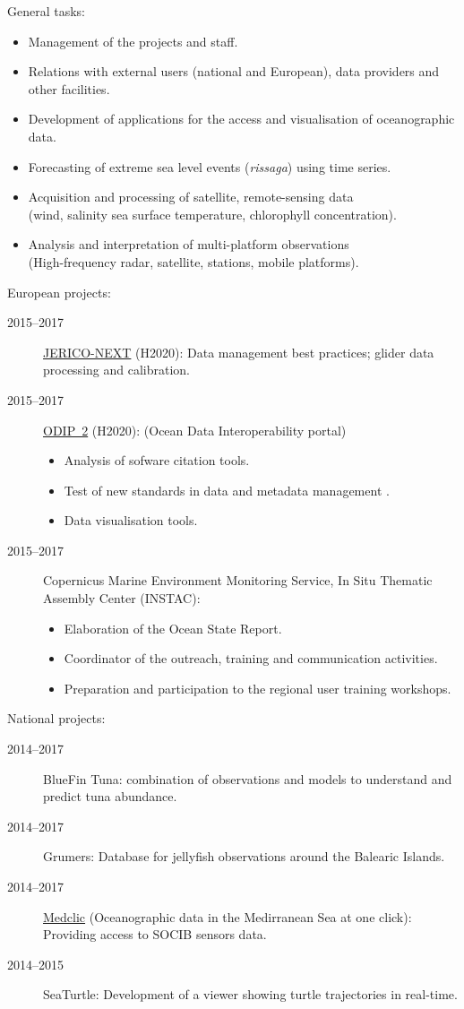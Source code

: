 \documentclass[10pt,a4paper,svgnames]{article}
\begin{document}
\begin{description}
General tasks:
\begin{itemize}%
\item Management of the projects and staff.
\item Relations with external users (national and European), data providers and other facilities.
\item Development of applications for the access and visualisation of oceanographic data.
\item Forecasting of extreme sea level events (\textit{rissaga}) using time series.
\item Acquisition and processing of satellite, remote-sensing data\\(wind, salinity sea surface temperature, chlorophyll concentration).
\item Analysis and interpretation of multi-platform observations\\(High-frequency radar, satellite, stations, mobile platforms).
\end{itemize}
European projects:
\begin{description}
\item[2015--2017] \href{http://www.jerico-ri.eu/}{JERICO-NEXT} (H2020): Data management best practices; glider data processing and calibration.
\item[2015--2017] \href{http://www.odip.eu/}{ODIP~2} (H2020):  (Ocean Data Interoperability portal)
\begin{itemize}
\item Analysis of sofware citation tools.
\item Test of new standards in data and metadata management .
\item Data visualisation tools.
\end{itemize}

\item[2015--2017] Copernicus Marine Environment Monitoring Service, In Situ Thematic Assembly Center (INSTAC):
\begin{itemize}
\item Elaboration of the Ocean State Report.
\item Coordinator of the outreach, training and communication activities.
\item Preparation and participation to the regional user training workshops.
\end{itemize}
\end{description}
National projects:
\begin{description}
\item[2014--2017] BlueFin Tuna: combination of observations and models to understand and predict tuna abundance.
\item[2014--2017] Grumers: Database for jellyfish observations around the Balearic Islands. 
\item[2014--2017] \href{http://medclic.es/es/news/research/asimilacion-datos.html}{Medclic} (Oceanographic data in the Medirranean Sea at one click): Providing access to SOCIB sensors data.
\item[2014--2015] SeaTurtle: Development of a viewer showing turtle trajectories in real-time.
\end{description}



\end{description}
\end{document}
